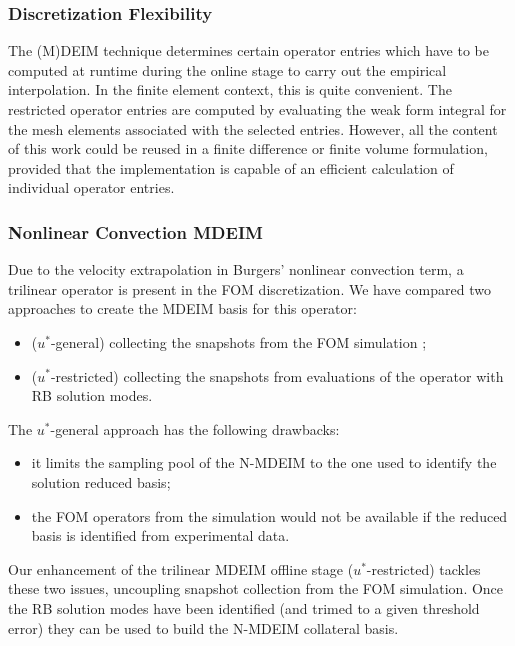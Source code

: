 \documentclass[thesis.tex]{subfiles}
\begin{document}
\subsubsection{Discretization Flexibility}
The (M)DEIM technique determines certain operator entries which 
have to be computed at runtime during the online stage 
to carry out the empirical interpolation.
In the finite element context, this is quite convenient.
The restricted operator entries are computed by evaluating the weak form integral
for the mesh elements associated with the selected entries. 
However, all the content of this work could be reused 
in a finite difference or finite volume formulation,
provided that the implementation is 
capable of an efficient calculation of individual operator entries.

\subsubsection{Nonlinear Convection MDEIM}
Due to the velocity extrapolation in Burgers' nonlinear convection term,
a trilinear operator is present in the FOM discretization.
We have compared two approaches to create the MDEIM basis for this operator:
\begin{itemize}
    \item (\mbox{$u^{*}$-general}) collecting the snapshots from the FOM simulation \cite{Santo_Manzoni_2019};
    \item (\mbox{$u^{*}$-restricted}) collecting the snapshots from evaluations of the operator with RB solution modes.
\end{itemize}
The \mbox{$u^{*}$-general} approach has the following drawbacks:
\begin{itemize}
    \item it limits the sampling pool of the \mbox{N-MDEIM} to 
    the one used to identify the solution reduced basis;
    \item the FOM operators from the simulation would not be available 
    if the reduced basis is identified from experimental data.
\end{itemize}
Our enhancement of the trilinear MDEIM offline stage (\mbox{$u^{*}$-restricted})
tackles these two issues, uncoupling snapshot collection from the FOM simulation.
Once the RB solution modes have been identified 
(and trimed to a given threshold error)
they can be used to build the \mbox{N-MDEIM} collateral basis.
\end{document}
